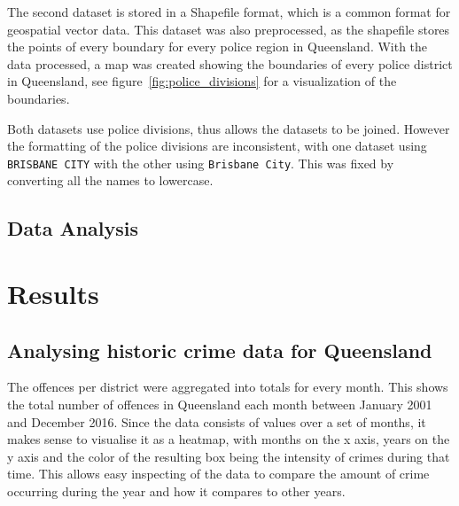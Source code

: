 \documentclass[]{article}
\begin{document}
The second dataset is stored in a Shapefile format, which is a common format for geospatial vector data.
This dataset was also preprocessed, as the shapefile stores the points of every boundary for every police region in Queensland.
With the data processed, a map was created showing the boundaries of every police district in Queensland, see  figure~\ref{fig:police_divisions} for a visualization of the boundaries.

Both datasets use police divisions, thus allows the datasets to be joined.
However the formatting of the police divisions are inconsistent,
with one dataset using \verb|BRISBANE CITY| with the other using \verb|Brisbane City|. 
This was fixed by converting all the names to lowercase.

\subsection{Data Analysis}

\section{Results}

\subsection{Analysing historic crime data for Queensland}

The offences per district were aggregated into totals for every month.
This shows the total number of offences in Queensland each month between January 2001 and December 2016.
Since the data consists of values over a set of months, it makes sense to visualise it as a heatmap, with months on the x axis, years on the y axis and the color of the resulting box being the intensity of crimes during that time.
This allows easy inspecting of the data to compare the amount of crime occurring during the year and how it compares to other years.
\end{document}
